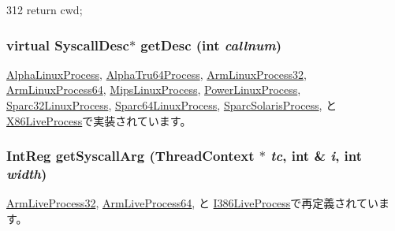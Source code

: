 \begin{DoxyCode}
312 { return cwd; }
\end{DoxyCode}
\hypertarget{classLiveProcess_a478f396f8895ef7728d26866a00121d7}{
\subsubsection[{getDesc}]{\setlength{\rightskip}{0pt plus 5cm}virtual {\bf SyscallDesc}$\ast$ getDesc (int {\em callnum})}}
\label{classLiveProcess_a478f396f8895ef7728d26866a00121d7}


\hyperlink{classAlphaISA_1_1AlphaLinuxProcess_aebbff609a7235342925445690acf5ee8}{AlphaLinuxProcess}, \hyperlink{classAlphaISA_1_1AlphaTru64Process_aebbff609a7235342925445690acf5ee8}{AlphaTru64Process}, \hyperlink{classArmLinuxProcess32_aebbff609a7235342925445690acf5ee8}{ArmLinuxProcess32}, \hyperlink{classArmLinuxProcess64_aebbff609a7235342925445690acf5ee8}{ArmLinuxProcess64}, \hyperlink{classMipsLinuxProcess_aebbff609a7235342925445690acf5ee8}{MipsLinuxProcess}, \hyperlink{classPowerLinuxProcess_aebbff609a7235342925445690acf5ee8}{PowerLinuxProcess}, \hyperlink{classSparcISA_1_1Sparc32LinuxProcess_a85e8ccf0c435d95c14574f0a217f5116}{Sparc32LinuxProcess}, \hyperlink{classSparcISA_1_1Sparc64LinuxProcess_a85e8ccf0c435d95c14574f0a217f5116}{Sparc64LinuxProcess}, \hyperlink{classSparcISA_1_1SparcSolarisProcess_aebbff609a7235342925445690acf5ee8}{SparcSolarisProcess}, と \hyperlink{classX86ISA_1_1X86LiveProcess_aebbff609a7235342925445690acf5ee8}{X86LiveProcess}で実装されています。\hypertarget{classLiveProcess_a383f46521b8667b58a1275f2a3e2fda1}{
\subsubsection[{getSyscallArg}]{\setlength{\rightskip}{0pt plus 5cm}IntReg getSyscallArg ({\bf ThreadContext} $\ast$ {\em tc}, \/  int \& {\em i}, \/  int {\em width})}}
\label{classLiveProcess_a383f46521b8667b58a1275f2a3e2fda1}


\hyperlink{classArmLiveProcess32_a52c7542cca5e7218361e5d1baf236cb2}{ArmLiveProcess32}, \hyperlink{classArmLiveProcess64_a52c7542cca5e7218361e5d1baf236cb2}{ArmLiveProcess64}, と \hyperlink{classX86ISA_1_1I386LiveProcess_afe872a4ad58edd7774a108ac2ff35d60}{I386LiveProcess}で再定義されています。



